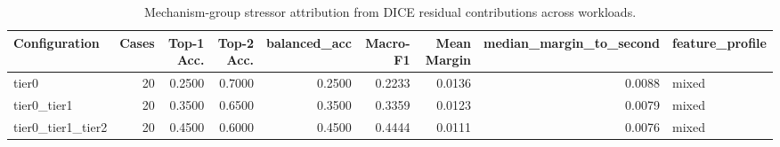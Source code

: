 \begin{table}[t]
\centering
\caption{Mechanism-group stressor attribution from DICE residual contributions across workloads.}
\label{tab:dice_stressor_diagnosis}
\footnotesize
\begin{tabular}{lrrrrrrrl}
\toprule
Configuration & Cases & Top-1 Acc. & Top-2 Acc. & balanced_acc & Macro-F1 & Mean Margin & median_margin_to_second & feature_profile \\
\midrule
tier0 & 20 & 0.2500 & 0.7000 & 0.2500 & 0.2233 & 0.0136 & 0.0088 & mixed \\
tier0_tier1 & 20 & 0.3500 & 0.6500 & 0.3500 & 0.3359 & 0.0123 & 0.0079 & mixed \\
tier0_tier1_tier2 & 20 & 0.4500 & 0.6000 & 0.4500 & 0.4444 & 0.0111 & 0.0076 & mixed \\
\bottomrule
\end{tabular}

\end{table}

